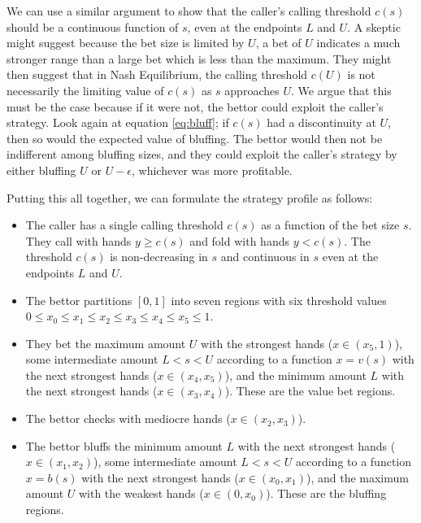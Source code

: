 \documentclass[a4paper,12pt]{article}
\begin{document}
We can use a similar argument to show that the caller's calling threshold $c(s)$ should be a continuous function of $s$, even at the endpoints $L$ and $U$. A skeptic might suggest because the bet size is limited by $U$, a bet of $U$ indicates a much stronger range than a large bet which is less than the maximum. They might then suggest that in Nash Equilibrium, the calling threshold $c(U)$ is not necessarily the limiting value of $c(s)$ as $s$ approaches $U$. We argue that this must be the case because if it were not, the bettor could exploit the caller's strategy. Look again at equation \ref{eq:bluff}; if $c(s)$ had a discontinuity at $U$, then so would the expected value of bluffing. The bettor would then not be indifferent among bluffing sizes, and they could exploit the caller's strategy by either bluffing $U$ or $U-\epsilon$, whichever was more profitable.

Putting this all together, we can formulate the strategy profile as follows:

\begin{itemize}
    \item The caller has a single calling threshold $c(s)$ as a function of the bet size $s$. They call with hands $y \geq c(s)$ and fold with hands $y < c(s)$. The threshold $c(s)$ is non-decreasing in $s$ and continuous in $s$ even at the endpoints $L$ and $U$.
    \item The bettor partitions $[0, 1]$ into seven regions with six threshold values $0 \leq x_0\leq x_1\leq x_2\leq x_3 \leq x_4 \leq x_5 \leq 1$. 
    \item They bet the maximum amount $U$ with the strongest hands ($x \in (x_5, 1)$), some intermediate amount $L < s < U$ according to a function $x = v(s)$ with the next strongest hands ($x \in (x_4, x_5)$), and the minimum amount $L$ with the next strongest hands ($x \in (x_3, x_4)$). These are the value bet regions.
    \item The bettor checks with mediocre hands ($x \in (x_2, x_3)$).
    \item The bettor bluffs the minimum amount $L$ with the next strongest hands ($x \in (x_1, x_2)$), some intermediate amount $L < s < U$ according to a function $x = b(s)$ with the next strongest hands ($x \in (x_0, x_1)$), and the maximum amount $U$ with the weakest hands ($x \in (0, x_0)$). These are the bluffing regions.
\end{itemize}
\end{document}
